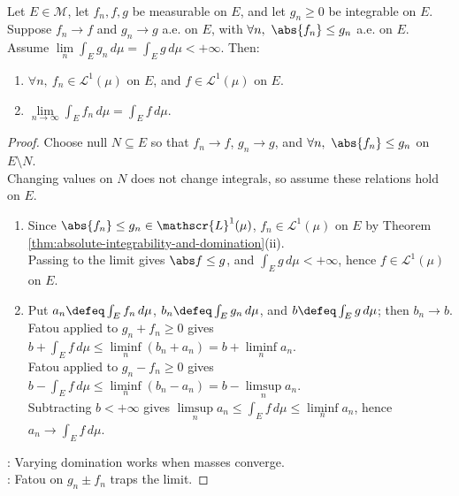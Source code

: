 \begin{theorem} \label{thm:general-dominated-convergence-lebesgue} \\
Let $E\in\mathcal{M}$, let $f_n,f,g$ be measurable on $E$, and let $g_n\geq0$ be integrable on $E$.\\
Suppose $f_n\to f$ and $g_n\to g$ a.e. on $E$, with $\forall n,\ \abs{f_n}\leq g_n$ a.e. on $E$.\\
Assume $\lim\limits_n\int_Eg_n\,d\mu=\int_Eg\,d\mu<+\infty$. Then:
\begin{enumerate}[label=(\roman*)]
\setlength{\itemsep}{0pt}
\item $\forall n,\ f_n\in\mathscr{L}^1(\mu)$ on $E$, and $f\in\mathscr{L}^1(\mu)$ on $E$.
\item $\lim\limits_{n\to\infty}\int_Ef_n\,d\mu=\int_Ef\,d\mu$.
\end{enumerate}
\begin{proof} Choose null $N\subseteq E$ so that $f_n\to f$, $g_n\to g$, and $\forall n,\ \abs{f_n}\leq g_n$ on $E\setminus N$.\\
Changing values on $N$ does not change integrals, so assume these relations hold on $E$.
\begin{enumerate}[label=(\roman*)]
\setlength{\itemsep}{0pt}
\item Since $\abs{f_n}\leq g_n\in\mathscr{L}^1(\mu)$, $f_n\in\mathscr{L}^1(\mu)$ on $E$ by Theorem \ref{thm:absolute-integrability-and-domination}(ii).\\
Passing to the limit gives $\abs f\leq g$, and $\int_Eg\,d\mu<+\infty$, hence $f\in\mathscr{L}^1(\mu)$ on $E$.
\item Put $a_n\defeq\int_Ef_n\,d\mu$, $b_n\defeq\int_Eg_n\,d\mu$, and $b\defeq\int_Eg\,d\mu$; then $b_n\to b$.\\
Fatou applied to $g_n+f_n\geq0$ gives $b+\int_Ef\,d\mu\leq\liminf\limits_n(b_n+a_n)=b+\liminf\limits_na_n$.\\
Fatou applied to $g_n-f_n\geq0$ gives $b-\int_Ef\,d\mu\leq\liminf\limits_n(b_n-a_n)=b-\limsup\limits_na_n$.\\
Subtracting $b<+\infty$ gives $\limsup\limits_na_n\leq\int_Ef\,d\mu\leq\liminf\limits_na_n$, hence $a_n\to\int_Ef\,d\mu$.
\end{enumerate}
: Varying domination works when masses converge.\\
: Fatou on $g_n\pm f_n$ traps the limit.
\end{proof}
\end{theorem}


